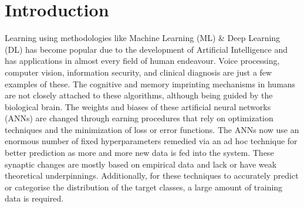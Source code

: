 \documentclass[runningheads]{llncs}
\begin{document}
\section{Introduction}
Learning using methodologies like Machine Learning (ML) \& Deep Learning (DL) has become popular due to the development of Artificial Intelligence and has applications in almost every field of human endeavour. Voice processing, computer vision, information security, and clinical diagnosis are just a few examples of these. The cognitive and memory imprinting mechanisms in humans are not closely attached to these algorithms, although being guided by the biological brain. The weights and biases of these artificial neural networks (ANNs) are changed through earning procedures that rely on optimization techniques and the minimization of loss or error functions. The ANNs now use an enormous number of fixed hyperparameters remedied via an ad hoc technique for better prediction as more and more new data is fed into the system. These synaptic changes are mostly based on empirical data and lack or have weak theoretical underpinnings. Additionally, for these techniques to accurately predict or categorise the distribution of the target classes, a large amount of training data is required.\\
\end{document}
